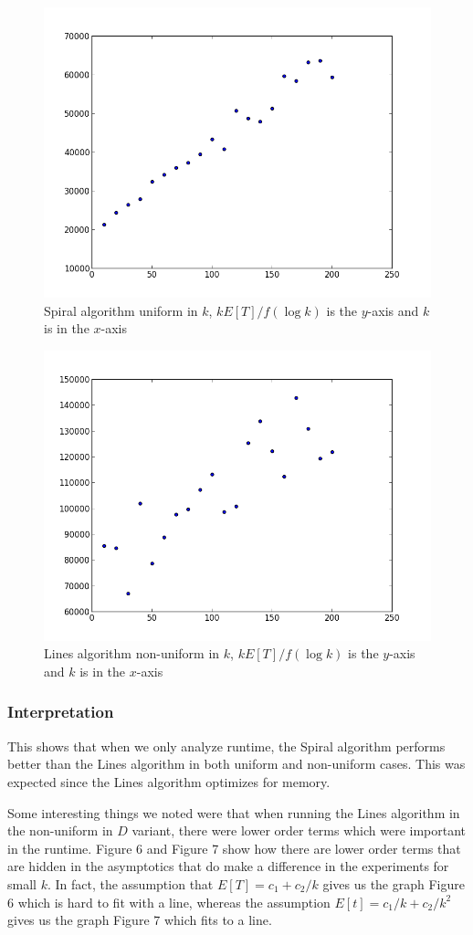 \documentclass[runningheads,a4paper]{llncs}
\begin{document}
\begin{figure}
\centering
\label{uniformresultsone}
\includegraphics[width=0.5\linewidth]{FKLS2.png}
\caption{Spiral algorithm uniform in $k$, $kE[T]/f(\log k)$ is the $y$-axis and $k$ is in the $x$-axis}
\end{figure}

\begin{figure}
\centering
\label{uniformresultstwo}
\includegraphics[width=0.5\linewidth]{LinesUniformInAll.png}
\caption{Lines algorithm non-uniform in $k$, $kE[T]/f(\log k)$ is the $y$-axis and $k$ is in the $x$-axis}
\end{figure}

\subsubsection{Interpretation}
This shows that when we only analyze runtime, the Spiral algorithm performs better than the Lines algorithm in both uniform and non-uniform cases. This was expected since the Lines algorithm optimizes for memory. 

Some interesting things we noted were that when running the Lines algorithm in the non-uniform in $D$ variant, there were lower order terms which were important in the runtime. Figure 6 and Figure 7 show how there are lower order terms that are hidden in the asymptotics that do make a difference in the experiments for small $k$. In fact, the assumption that $E[T] = c_1 + c_2 / k$ gives us the graph Figure 6 which is hard to fit with a line, whereas the assumption $E[t] = c_1/ k + c_2 / k^2$ gives us the graph Figure 7 which fits to a line.
\end{document}
